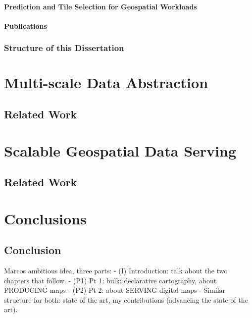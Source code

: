 \documentclass[11pt, oneside]{report}   	%
\begin{document}
\subsection{Prediction and Tile Selection for Geospatial Workloads}
\subsection{Publications}

\section{Structure of this Dissertation}

\part{Multi-scale Data Abstraction}
\chapter{Related Work}

\part{Scalable Geospatial Data Serving}
\chapter{Related Work}

\part{Conclusions}
\chapter{Conclusion}






Marcos ambitious idea, three parts:
- (I) Introduction: talk about the two chapters that follow. 
- (P1) Pt 1: bulk: declarative cartography, about PRODUCING maps
- (P2) Pt 2: about SERVING digital maps
- Similar structure for both: state of the art, my contributions (advancing the state of the art).  
\end{document}
